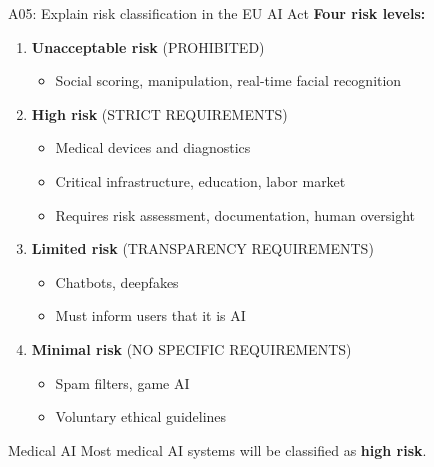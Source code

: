 \documentclass[aspectratio=169, 10pt]{beamer}
\begin{document}
\begin{frame}{A05: Explain risk classification in the EU AI Act}
    \textbf{Four risk levels:}
    
    \vspace{0.3cm}
    \begin{enumerate}
        \item \textbf{Unacceptable risk} (PROHIBITED)
        \begin{itemize}
            \item Social scoring, manipulation, real-time facial recognition
        \end{itemize}
        
        \item \textbf{High risk} (STRICT REQUIREMENTS)
        \begin{itemize}
            \item Medical devices and diagnostics
            \item Critical infrastructure, education, labor market
            \item Requires risk assessment, documentation, human oversight
        \end{itemize}
        
        \item \textbf{Limited risk} (TRANSPARENCY REQUIREMENTS)
        \begin{itemize}
            \item Chatbots, deepfakes
            \item Must inform users that it is AI
        \end{itemize}
        
        \item \textbf{Minimal risk} (NO SPECIFIC REQUIREMENTS)
        \begin{itemize}
            \item Spam filters, game AI
            \item Voluntary ethical guidelines
        \end{itemize}
    \end{enumerate}
    
    \begin{alertblock}{Medical AI}
        Most medical AI systems will be classified as \textbf{high risk}.
    \end{alertblock}
\end{frame}
\end{document}
